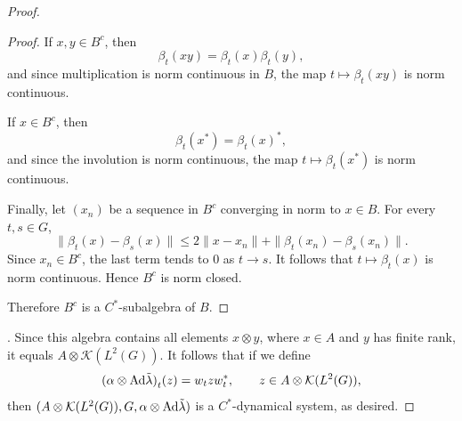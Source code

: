 \documentclass{book}
\begin{document}
\begin{proof}
{\begin{proof}
      If \(x,y\in B^c\), then
      \[
      \beta_t(xy)
      =
      \beta_t(x)\beta_t(y),
      \]
      and since multiplication is norm continuous in \(B\), the map
      \(t\mapsto\beta_t(xy)\) is norm continuous.

      If \(x\in B^c\), then
      \[
      \beta_t(x^*)
      =
      \beta_t(x)^*,
      \]
      and since the involution is norm continuous, the map
      \(t\mapsto\beta_t(x^*)\) is norm continuous.

      Finally, let \((x_n)\) be a sequence in \(B^c\) converging in norm to
      \(x\in B\). For every \(t,s\in G\),
      \[
      \|\beta_t(x)-\beta_s(x)\|
      \le
      2\|x-x_n\|
      +
      \|\beta_t(x_n)-\beta_s(x_n)\|.
      \]
      Since \(x_n\in B^c\), the last term tends to \(0\) as \(t\to s\). It follows
      that \(t\mapsto\beta_t(x)\) is norm continuous. Hence \(B^c\) is norm closed.

      Therefore \(B^c\) is a \(C^*\)-subalgebra of \(B\).
    \end{proof}
  }. Since this algebra contains all elements \(x\otimes y\),
  where \(x\in A\) and \(y\) has finite rank, it equals \(A\otimes\mathcal{K}(L^2(G))\).
  It follows that if we define
  \[
    {(\alpha\otimes\textnormal{Ad}\tilde{\lambda})}_t(z)=w_t z w_t^*,\qquad z\in A\otimes\mathcal{K}(L^2(G)),
  \]
  then \((A\otimes\mathcal{K}(L^2(G)), G, \alpha\otimes\textnormal{Ad}\tilde{\lambda})\) is a \(C^*\)-dynamical system, as desired.
\end{proof}
\end{document}
